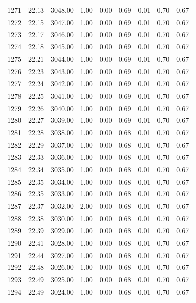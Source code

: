 \documentclass{article}\usepackage[]{graphicx}\usepackage[]{color}
\begin{document}
\begin{longtable}{rrrrrrrrr}
  1271 & 22.13 & 3048.00 & 1.00 & 0.00 & 0.69 & 0.01 & 0.70 & 0.67 \\ 
  1272 & 22.15 & 3047.00 & 1.00 & 0.00 & 0.69 & 0.01 & 0.70 & 0.67 \\ 
  1273 & 22.17 & 3046.00 & 1.00 & 0.00 & 0.69 & 0.01 & 0.70 & 0.67 \\ 
  1274 & 22.18 & 3045.00 & 1.00 & 0.00 & 0.69 & 0.01 & 0.70 & 0.67 \\ 
  1275 & 22.21 & 3044.00 & 1.00 & 0.00 & 0.69 & 0.01 & 0.70 & 0.67 \\ 
  1276 & 22.23 & 3043.00 & 1.00 & 0.00 & 0.69 & 0.01 & 0.70 & 0.67 \\ 
  1277 & 22.24 & 3042.00 & 1.00 & 0.00 & 0.69 & 0.01 & 0.70 & 0.67 \\ 
  1278 & 22.25 & 3041.00 & 1.00 & 0.00 & 0.69 & 0.01 & 0.70 & 0.67 \\ 
  1279 & 22.26 & 3040.00 & 1.00 & 0.00 & 0.69 & 0.01 & 0.70 & 0.67 \\ 
  1280 & 22.27 & 3039.00 & 1.00 & 0.00 & 0.69 & 0.01 & 0.70 & 0.67 \\ 
  1281 & 22.28 & 3038.00 & 1.00 & 0.00 & 0.68 & 0.01 & 0.70 & 0.67 \\ 
  1282 & 22.29 & 3037.00 & 1.00 & 0.00 & 0.68 & 0.01 & 0.70 & 0.67 \\ 
  1283 & 22.33 & 3036.00 & 1.00 & 0.00 & 0.68 & 0.01 & 0.70 & 0.67 \\ 
  1284 & 22.34 & 3035.00 & 1.00 & 0.00 & 0.68 & 0.01 & 0.70 & 0.67 \\ 
  1285 & 22.35 & 3034.00 & 1.00 & 0.00 & 0.68 & 0.01 & 0.70 & 0.67 \\ 
  1286 & 22.35 & 3033.00 & 1.00 & 0.00 & 0.68 & 0.01 & 0.70 & 0.67 \\ 
  1287 & 22.37 & 3032.00 & 2.00 & 0.00 & 0.68 & 0.01 & 0.70 & 0.67 \\ 
  1288 & 22.38 & 3030.00 & 1.00 & 0.00 & 0.68 & 0.01 & 0.70 & 0.67 \\ 
  1289 & 22.39 & 3029.00 & 1.00 & 0.00 & 0.68 & 0.01 & 0.70 & 0.67 \\ 
  1290 & 22.41 & 3028.00 & 1.00 & 0.00 & 0.68 & 0.01 & 0.70 & 0.67 \\ 
  1291 & 22.44 & 3027.00 & 1.00 & 0.00 & 0.68 & 0.01 & 0.70 & 0.67 \\ 
  1292 & 22.48 & 3026.00 & 1.00 & 0.00 & 0.68 & 0.01 & 0.70 & 0.67 \\ 
  1293 & 22.49 & 3025.00 & 1.00 & 0.00 & 0.68 & 0.01 & 0.70 & 0.67 \\ 
  1294 & 22.49 & 3024.00 & 1.00 & 0.00 & 0.68 & 0.01 & 0.70 & 0.67 \\ 

\end{longtable}
\end{document}
